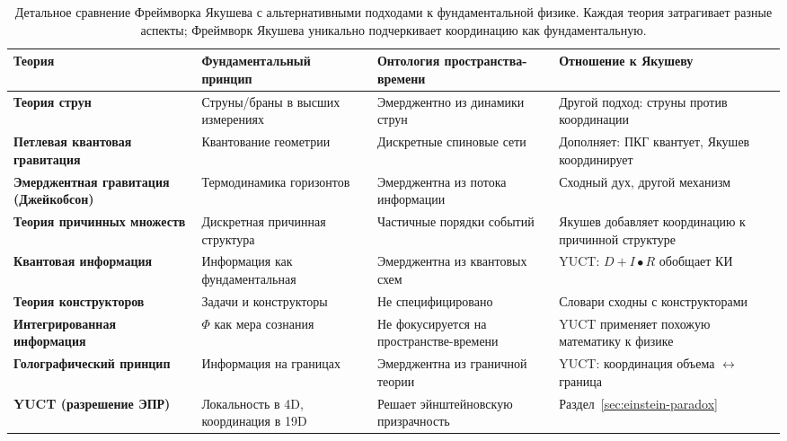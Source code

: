 \documentclass[11pt,a4paper]{article}
\begin{document}
	\begin{table}[htbp]
		\centering
		\scriptsize
		\begin{tabular}{p{}p{}p{}p{}}
			\toprule
			\textbf{Теория} & \textbf{Фундаментальный принцип} & \textbf{Онтология пространства-времени} & \textbf{Отношение к Якушеву} \\
			\midrule
			\textbf{Теория струн} & 
			Струны/браны в высших измерениях & 
			Эмерджентно из динамики струн & 
			Другой подход: струны против координации \\
			\hline
			\textbf{Петлевая квантовая гравитация} & 
			Квантование геометрии & 
			Дискретные спиновые сети & 
			Дополняет: ПКГ квантует, Якушев координирует \\
			\hline
			\textbf{Эмерджентная гравитация (Джейкобсон)} & 
			Термодинамика горизонтов & 
			Эмерджентна из потока информации & 
			Сходный дух, другой механизм \\
			\hline
			\textbf{Теория причинных множеств} & 
			Дискретная причинная структура & 
			Частичные порядки событий & 
			Якушев добавляет координацию к причинной структуре \\
			\hline
			\textbf{Квантовая информация} & 
			Информация как фундаментальная & 
			Эмерджентна из квантовых схем & 
			YUCT: $D+I•R$ обобщает КИ \\
			\hline
			\textbf{Теория конструкторов} & 
			Задачи и конструкторы & 
			Не специфицировано & 
			Словари сходны с конструкторами \\
			\hline
			\textbf{Интегрированная информация} & 
			$\Phi$ как мера сознания & 
			Не фокусируется на пространстве-времени & 
			YUCT применяет похожую математику к физике \\
			\hline
			\textbf{Голографический принцип} & 
			Информация на границах & 
			Эмерджентна из граничной теории & 
			YUCT: координация объема $\leftrightarrow$ граница \\
			\hline
			\textbf{YUCT (разрешение ЭПР)} & 
			Локальность в 4D, координация в 19D & 
			Решает эйнштейновскую призрачность & 
			Раздел~\ref{sec:einstein-paradox} \\
			\bottomrule
		\end{tabular}
		\caption{Детальное сравнение Фреймворка Якушева с альтернативными подходами к фундаментальной физике. Каждая теория затрагивает разные аспекты; Фреймворк Якушева уникально подчеркивает координацию как фундаментальную.}
	\end{table}
	
\end{document}
